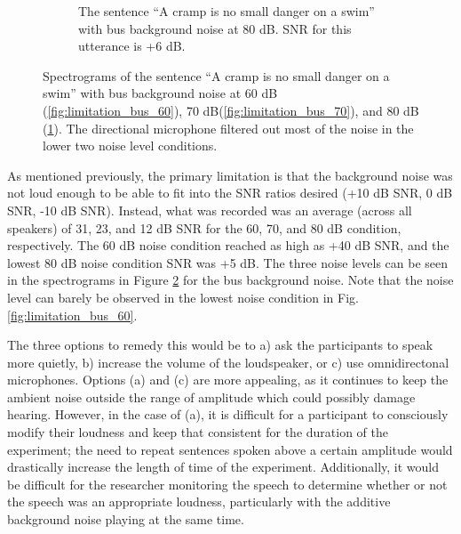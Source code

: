 \begin{figure}[H]
\begin{center}
\begin{subfigure}{0.475\textwidth}
  \caption{The sentence ``A cramp is no small danger on a swim'' with bus background noise at 80 dB. SNR for this utterance is +6 dB.}
  \label{fig:limitation_bus_80}
\end{subfigure}
\end{center}
\caption{Spectrograms of the sentence ``A cramp is no small danger on a swim'' with bus background noise at 60 dB (\ref{fig:limitation_bus_60}), 70 dB(\ref{fig:limitation_bus_70}), and 80 dB (\ref{fig:limitation_bus_80}). The directional microphone filtered out most of the noise in the lower two noise level conditions.}
\label{fig:noise_level_limitation}
\end{figure}

As mentioned previously, the primary limitation is that the background noise was not loud enough to be able to fit into the SNR ratios desired (+10 dB SNR, 0 dB SNR, -10 dB SNR).  Instead, what was recorded was an average (across all speakers) of 31, 23, and 12 dB SNR for the 60, 70, and 80 dB condition, respectively.  The 60 dB noise condition reached as high as +40 dB SNR, and the lowest 80 dB noise condition SNR was +5 dB. The three noise levels can be seen in the spectrograms in Figure \ref{fig:noise_level_limitation} for the bus background noise.  Note that the noise level can barely be observed in the lowest noise condition in Fig. \ref{fig:limitation_bus_60}.

The three options to remedy this would be to a) ask the participants to speak more quietly, b) increase the volume of the loudspeaker, or c) use omnidirectonal microphones.  Options (a) and (c) are more appealing, as it continues to keep the ambient noise outside the range of amplitude which could possibly damage hearing.  However, in the case of (a), it is difficult for a participant to consciously modify their loudness and keep that consistent for the duration of the experiment; the need to repeat sentences spoken above a certain amplitude would drastically increase the length of time of the experiment.  Additionally, it would be difficult for the researcher monitoring the speech to determine whether or not the speech was an appropriate loudness, particularly with the additive background noise playing at the same time.  


